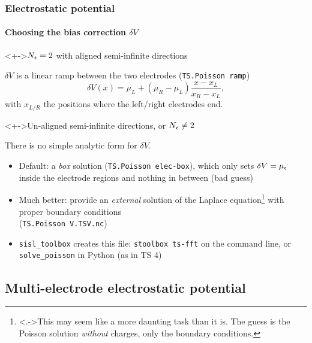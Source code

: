 \begin{frame}
  \frametitle{Electrostatic potential}
  \framesubtitle{Choosing the bias correction $\delta V$}

  \begin{block}<+->{$N_{\mathfrak{e}}=2$ with aligned semi-infinite directions}

    $\delta V$ is a linear ramp between the two electrodes (\texttt{TS.Poisson ramp})
    \begin{equation*}
      \delta V(x) = \mu_L + (\mu_R-\mu_L)\frac{x-x_L}{x_R-x_L},
    \end{equation*}
    with $x_{L/R}$ the positions where the left/right electrodes end.

  \end{block}

  \begin{block}<+->{Un-aligned semi-infinite directions, or $N_{\mathfrak{e}}\neq2$}

    There is no simple analytic form for $\delta V$.

    \begin{itemize}[<+->]
      \item Default: a \emph{box} solution (\texttt{TS.Poisson elec-box}), which only sets
      $\delta V=\mu_{\mathfrak{e}}$ inside the electrode regions and nothing in between (bad
      guess)

      \item Much better: provide an \emph{external} solution of the Laplace
      equation\footnote{\uncover<.->{This may seem like a more daunting task than it is.
            The guess is the Poisson solution \emph{without} charges, only the boundary
            conditions.}} with proper boundary conditions\\
      (\texttt{TS.Poisson V.TSV.nc})

      \item \texttt{sisl\_toolbox} creates this file: \texttt{stoolbox ts-fft} on the
      command line, or \texttt{solve\_poisson} in Python (as in TS 4)

    \end{itemize}

  \end{block}

\end{frame}


\subsection{Multi-electrode electrostatic potential}

